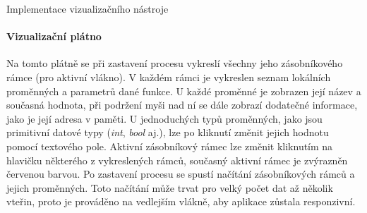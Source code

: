 \documentclass[czech,bachelor,male,python,dept460]{diploma}						%
\begin{document}
\begin{section}{Implementace vizualizačního nástroje}
	\paragraph*{Vizualizační plátno} Na tomto plátně se při zastavení procesu vykreslí všechny jeho zásobníkového rámce (pro aktivní vlákno). V každém rámci je
		vykreslen seznam lokálních proměnných a parametrů dané funkce. U každé proměnné je zobrazen její název a současná hodnota, při podržení myši nad ní se dále
		zobrazí dodatečné informace, jako je její adresa v paměti. U jednoduchých typů proměnných, jako jsou primitivní datové typy (\textit{int}, \textit{bool}
		aj.), lze po kliknutí změnit jejich hodnotu pomocí textového pole. Aktivní zásobníkový rámec lze změnit kliknutím na hlavičku některého z vykreslených
		rámců, současný aktivní rámec je zvýrazněn červenou barvou. Po zastavení procesu se spustí načítání zásobníkových
		rámců a jejich proměnných. Toto načítání může trvat pro velký počet dat až několik vteřin, proto je prováděno na vedlejším vlákně, aby aplikace
		zůstala responzivní.

\end{section}
\end{document}

